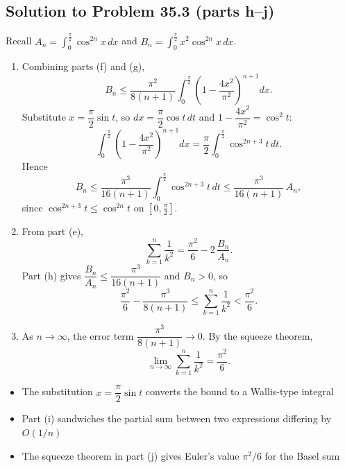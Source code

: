 
\subsection{Solution to Problem 35.3 (parts h--j)}

\begin{solution}
Recall $A_n = \displaystyle\int_{0}^{\frac{\pi}{2}} \cos^{2n} x \, dx$ and $B_n = \displaystyle\int_{0}^{\frac{\pi}{2}} x^2 \cos^{2n} x \, dx$.

\begin{enumerate}
\item[(h)] Combining parts (f) and (g),
\[
B_n \le \frac{\pi^2}{8(n+1)}\int_{0}^{\frac{\pi}{2}} \left(1 - \frac{4x^2}{\pi^2}\right)^{n+1} dx.
\]
Substitute $x = \dfrac{\pi}{2}\sin t$, so $dx = \dfrac{\pi}{2}\cos t \, dt$ and $1 - \dfrac{4x^2}{\pi^2} = \cos^2 t$:
\[
\int_{0}^{\frac{\pi}{2}} \left(1 - \frac{4x^2}{\pi^2}\right)^{n+1} dx
= \frac{\pi}{2}\int_{0}^{\frac{\pi}{2}} \cos^{2n+3} t \, dt.
\]
Hence
\[
B_n \le \frac{\pi^3}{16(n+1)}\int_{0}^{\frac{\pi}{2}} \cos^{2n+3} t \, dt
\le \frac{\pi^3}{16(n+1)}\,A_n,
\]
since $\cos^{2n+3} t \le \cos^{2n} t$ on $\left[0, \frac{\pi}{2}\right]$.

\item[(i)] From part (e),
\[
\sum_{k=1}^{n}\frac{1}{k^2} = \frac{\pi^2}{6} - 2\,\frac{B_n}{A_n}.
\]
Part (h) gives $\dfrac{B_n}{A_n} \le \dfrac{\pi^3}{16(n+1)}$ and $B_n > 0$, so
\[
\frac{\pi^2}{6} - \frac{\pi^3}{8(n+1)}
\le \sum_{k=1}^{n}\frac{1}{k^2}
< \frac{\pi^2}{6}.
\]

\item[(j)] As $n \to \infty$, the error term $\dfrac{\pi^3}{8(n+1)} \to 0$. By the squeeze theorem,
\[
\lim_{n\to\infty}\sum_{k=1}^{n}\frac{1}{k^2} = \frac{\pi^2}{6}.
\]
\end{enumerate}
\end{solution}

\begin{takeaways}
\begin{itemize}
    \item The substitution $x = \dfrac{\pi}{2}\sin t$ converts the bound to a Wallis-type integral
    \item Part (i) sandwiches the partial sum between two expressions differing by $O(1/n)$
    \item The squeeze theorem in part (j) gives Euler's value $\pi^2/6$ for the Basel sum
\end{itemize}
\end{takeaways}
